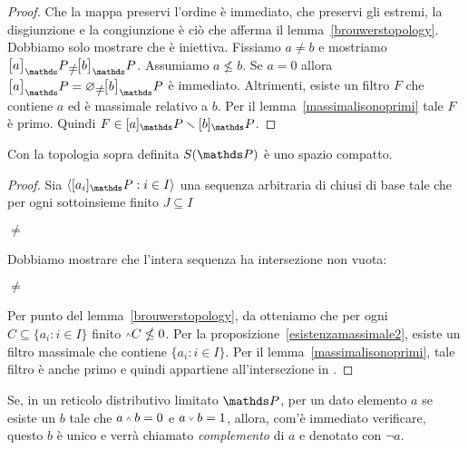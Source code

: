 \begin{proof}
Che la mappa preservi l'ordine \`e immediato, che preservi gli estremi, la disgiunzione e la congiunzione \`e ci\`o che afferma il lemma~\ref{brouwerstopology}. Dobbiamo solo mostrare che \`e iniettiva. Fissiamo $a\neq b$ e mostriamo $\big[a\big]_\PP\neq\big[b\big]_\PP$. Assumiamo $a\nleq b$. Se $a= 0$ allora $\big[a\big]_\PP=\0\neq\big[b\big]_\PP$ \`e immediato. Altrimenti, esiste un filtro $F$ che contiene $a$ ed \`e massimale relativo a $b$. Per il lemma~\ref{massimalisonoprimi} tale $F$ \`e primo. Quindi $F\in [a]_\PP\sm[b]_\PP$. 
\end{proof}

\def\ceqq#1#2#3#4{\parbox{25ex}{#4\hfill}\llap{#1}\parbox{6ex}{\hfil#2}\rlap{#3}}

\begin{lemma}\label{reticolocompatto}
Con la topologia sopra definita $S(\PP)$ \`e uno spazio compatto.
\end{lemma}
\begin{proof}
Sia $\<[a_i]_\PP:i\in I\>$ una sequenza arbitraria di chiusi di base tale che per ogni sottoinsieme finito $J\subseteq I$

\ceqq{$\displaystyle\bigcap_{i\in J}[a_i]_\PP$}{$\neq$}{$\0$}{\ssf{1.}}

Dobbiamo mostrare che l'intera sequenza ha intersezione non vuota:

\ceqq{$\displaystyle\bigcap_{i\in I}[a_i]_\PP$}{$\neq$}{$\0$}{\ssf{2.}}

Per punto  del lemma~\ref{brouwerstopology}, da  otteniamo che per ogni $C\subseteq \{a_i:i\in I\}$ finito $\swedge C\nleq 0$. Per la proposizione~\ref{esistenzamassimale2}, esiste un filtro massimale che contiene $\{a_i:i\in I\}$. Per il lemma~\ref{massimalisonoprimi}, tale filtro \`e anche primo e quindi appartiene all'intersezione in .
\end{proof}

Se, in un reticolo distributivo limitato $\PP$, per un dato elemento $a$ se esiste un $b$ tale che  $a\swedge  b=0$ e $a\svee b=1$, allora, com'\`e immediato verificare, questo $b$ \`e unico e verr\`a chiamato \emph{complemento\/} di $a$ e denotato con $\neg a$. 

